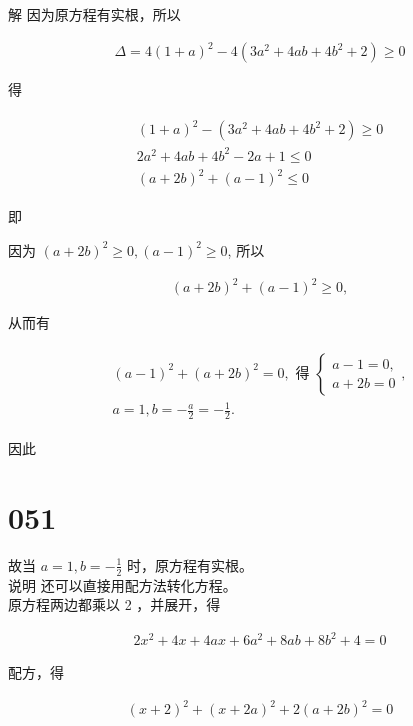 \documentclass[10pt]{article}
\begin{document}
解 因为原方程有实根，所以

\begin{align*}
\Delta=4(1+a)^{2}-4\left(3 a^{2}+4 a b+4 b^{2}+2\right) \geqslant 0
\end{align*}

得

\begin{align*}
\begin{gathered}
(1+a)^{2}-\left(3 a^{2}+4 a b+4 b^{2}+2\right) \geqslant 0 \\
2 a^{2}+4 a b+4 b^{2}-2 a+1 \leqslant 0 \\
(a+2 b)^{2}+(a-1)^{2} \leqslant 0
\end{gathered}
\end{align*}

即

因为 $(a+2 b)^{2} \geqslant 0,(a-1)^{2} \geqslant 0$, 所以

\begin{align*}
(a+2 b)^{2}+(a-1)^{2} \geqslant 0,
\end{align*}

从而有

\begin{align*}
\begin{gathered}
(a-1)^{2}+(a+2 b)^{2}=0, \text { 得 }\left\{\begin{array}{l}
a-1=0, \\
a+2 b=0
\end{array},\right. \\
a=1, b=-\frac{a}{2}=-\frac{1}{2} .
\end{gathered}
\end{align*}

因此

\section*{051}
故当 $a=1, b=-\frac{1}{2}$ 时，原方程有实根。\\
说明 还可以直接用配方法转化方程。\\
原方程两边都乘以 2 ，并展开，得

\begin{align*}
2 x^{2}+4 x+4 a x+6 a^{2}+8 a b+8 b^{2}+4=0
\end{align*}

配方，得

\begin{align*}
(x+2)^{2}+(x+2 a)^{2}+2(a+2 b)^{2}=0
\end{align*}
\end{document}
